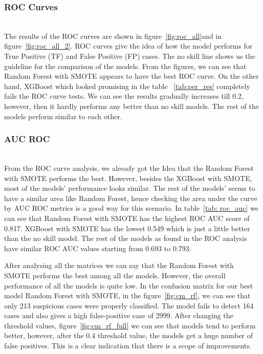 \subsubsection{ROC Curves}\hspace*{\fill} \\
The results of the ROC curves are shown in figure~\ref{fig:roc_all}and in figure~\ref{fig:roc_all_2}. ROC curves give the idea of how the model performs for True Positive (TF) and False Positive (FP) cases. The no skill line shows us the guideline for the comparison of the models. From the figures, we can see that Random Forest with SMOTE appears to have the best ROC curve. On the other hand, XGBoost which looked promising in the table ~\ref{tab:per_res} completely fails the ROC curve tests. We can see the results gradually increases till 0.2, however, then it hardly performs any better than no skill models. The rest of the models perform similar to each other. 


\subsubsection{AUC ROC}\hspace*{\fill} \\
From the ROC curve analysis, we already got the Idea that the Random Forest with SMOTE performs the best. However, besides the XGBoost with SMOTE, most of the models' performance looks similar. The rest of the models' seems to have a similar area like Random Forest, hence checking the area under the curve by AUC ROC metrics is a good way for this scenario. In table~\ref{tab: roc_auc} we can see that Random Forest with SMOTE has the highest ROC AUC score of 0.817. XGBoost with SMOTE has the lowest 0.549 which is just a little better than the no skill model. The rest of the models as found in the ROC analysis have similar ROC AUC values starting from 0.693 to 0.793.


After analysing all the matrices we can say that the Random Forest with SMOTE performs the best among all the models. However, the overall performance of all the models is quite low. In the confusion matrix for our best model Random Forest with SMOTE, in the figure~\ref{fig:cm_rf}, we can see that only 213 suspicious cases were properly classified. The model fails to detect 164 cases and also gives a high false-positive case of 2999. After changing the threshold values, figure~\ref{fig:cm_rf_full} we can see that models tend to perform better, however, after the 0.4 threshold value, the models get a huge number of false positives. This is a clear indication that there is a scope of improvements. 